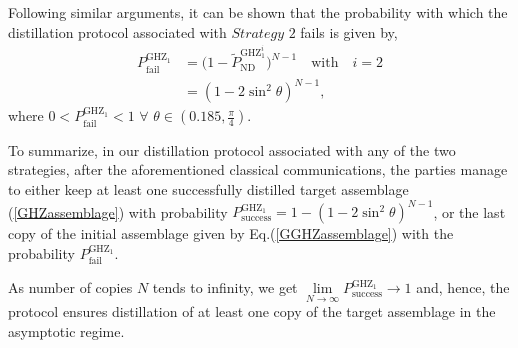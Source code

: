 \documentclass[reprint,superscriptaddress,nofootinbib,amsmath,amssymb,aps,pra,longbibliography]{revtex4-1}
\begin{document}
Following similar arguments, it can be shown that the  probability with which the distillation protocol associated with $\textit{Strategy 2}$ fails is given by,
\begin{align}
 P^{\text{GHZ}_1}_{\text{fail}} &= \big(1- \tilde{P}_{\text{ND}}^{\text{GHZ}_1^i} \big)^{N-1}  \quad \text{with} \quad i=2 \nonumber \\
 &=(1-2\sin^2\theta)^{N-1},
\end{align} 
where $0 < P^{\text{GHZ}_1}_{\text{fail}} < 1$ $\forall$ $\theta \in ( 0.185, \frac{\pi}{4})$.

To summarize, in our distillation protocol associated with any of the two strategies, after the aforementioned classical communications, the parties manage to either keep at least one successfully distilled target assemblage (\ref{GHZassemblage})  with probability $P^{\text{GHZ}_1}_{\text{success}} = 1-(1-2\sin^2\theta)^{N-1}$, or the last copy of the initial assemblage  given by Eq.(\ref{GGHZassemblage}) with the probability $P^{\text{GHZ}_1}_{\text{fail}}$.

As number of copies $N$ tends to infinity, we get $\lim\limits_{N\to\infty} P^{\text{GHZ}_1}_{\text{success}} \rightarrow 1$ and, hence, the protocol ensures distillation of at least one copy of the target assemblage in the asymptotic regime.
\end{document}
